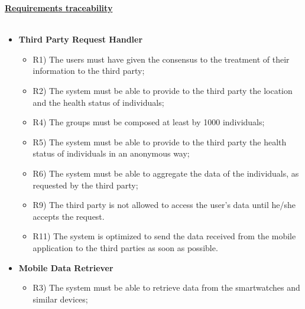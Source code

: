 	\underline{\textbf{Requirements traceability}}\\\\
	\begin{itemize}
		\item \textbf{Third Party Request Handler}
		\begin{itemize}
			\item R1) The users must have given the consensus to the treatment of their information to the third party;\\
			\item R2) The system must be able to provide to the third party the location and the health status of individuals;
			\item R4) The groups must be composed at least by 1000 individuals;\\
			\item R5) The system must be able to provide to the third party the health status of individuals in an anonymous way;\\
			\item R6) The system must be able to aggregate the data of the individuals, as requested by the third party;\\
			\item R9) The third party is not allowed to access the user’s data until he/she accepts the request.\\
			\item R11) The system is optimized to send the data received from the mobile application to the third parties as soon as possible.\\
		\end{itemize}
		\item \textbf{Mobile Data Retriever}
		\begin{itemize}
			\item R3) The system must be able to retrieve data from the smartwatches and similar devices;\\


\end{itemize}
\end{itemize}
